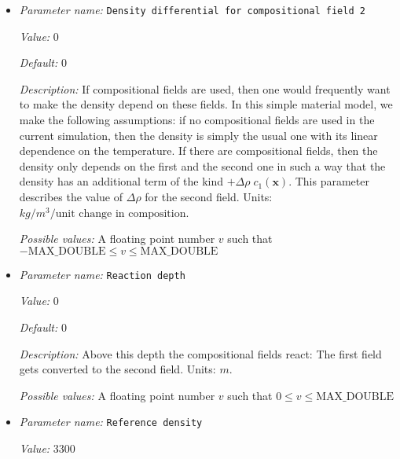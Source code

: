 \begin{itemize}
{\it Possible values:} A floating point number $v$ such that $-\text{MAX\_DOUBLE} \leq v \leq \text{MAX\_DOUBLE}$
\item {\it Parameter name:} {\tt Density differential for compositional field 2}
\label{parameters:Material model/Composition reaction model/Density differential for compositional field 2}


{\it Value:} 0


{\it Default:} 0


{\it Description:} If compositional fields are used, then one would frequently want to make the density depend on these fields. In this simple material model, we make the following assumptions: if no compositional fields are used in the current simulation, then the density is simply the usual one with its linear dependence on the temperature. If there are compositional fields, then the density only depends on the first and the second one in such a way that the density has an additional term of the kind $+\Delta \rho \; c_1(\mathbf x)$. This parameter describes the value of $\Delta \rho$ for the second field. Units: $kg/m^3/\textrm{unit change in composition}$.


{\it Possible values:} A floating point number $v$ such that $-\text{MAX\_DOUBLE} \leq v \leq \text{MAX\_DOUBLE}$
\item {\it Parameter name:} {\tt Reaction depth}
\label{parameters:Material model/Composition reaction model/Reaction depth}


{\it Value:} 0


{\it Default:} 0


{\it Description:} Above this depth the compositional fields react: The first field gets converted to the second field. Units: $m$.


{\it Possible values:} A floating point number $v$ such that $0 \leq v \leq \text{MAX\_DOUBLE}$
\item {\it Parameter name:} {\tt Reference density}
\label{parameters:Material model/Composition reaction model/Reference density}


{\it Value:} 3300



\end{itemize}
